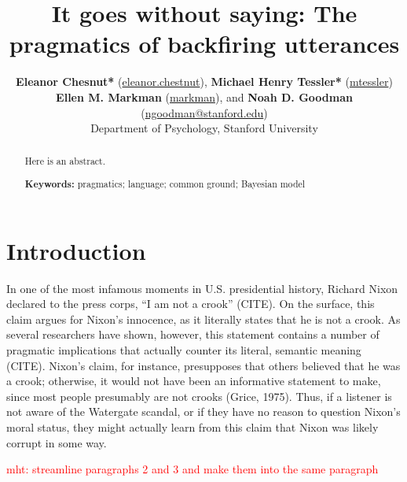 \documentclass[10pt,letterpaper]{article}
\title{It goes without saying: The pragmatics of backfiring utterances}
\author{{\large \bf Eleanor Chesnut*} (\url{eleanor.chestnut}), {\large \bf Michael Henry Tessler*} (\url{mtessler}) \\
{\large \bf Ellen M. Markman} (\url{markman}), and {\large \bf Noah D. Goodman} (\url{ngoodman@stanford.edu})  \\
  Department of Psychology, Stanford University}
\newcommand{\red}[1]{\textcolor{Red}{#1}}
\begin{document}
\maketitle


\begin{abstract}

Here is an abstract.

\textbf{Keywords:} 
pragmatics; language; common ground; Bayesian model

\end{abstract}

\section{Introduction}
In one of the most infamous moments in U.S. presidential history, Richard Nixon declared to the press corps, “I am not a crook” (CITE).  On the surface, this claim argues for Nixon’s innocence, as it literally states that he is not a crook.  As several researchers have shown, however, this statement contains a number of pragmatic implications that actually counter its literal, semantic meaning (CITE).  Nixon’s claim, for instance, presupposes that others believed that he was a crook; otherwise, it would not have been an informative statement to make, since most people presumably are not crooks (Grice, 1975).  Thus, if a listener is not aware of the Watergate scandal, or if they have no reason to question Nixon’s moral status, they might actually learn from this claim that Nixon was likely corrupt in some way.

\red{mht: streamline paragraphs 2 and 3 and make them into  the same paragraph}
\end{document}
